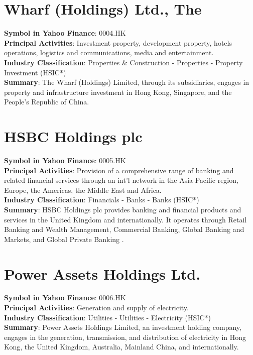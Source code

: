 \section{Wharf (Holdings) Ltd., The}
\textbf{Symbol in Yahoo Finance}: 0004.HK\\
\textbf{Principal Activities}: Investment property, development property, hotels operations, logistics and communications, media and entertainment.\\
\textbf{Industry Classification}: Properties \& Construction - Properties - Property Investment (HSIC*)\\
\textbf{Summary}: The Wharf (Holdings) Limited, through its subsidiaries, engages in property and infrastructure investment in Hong Kong, Singapore, and the People's Republic of China.


\section{HSBC Holdings plc}
\textbf{Symbol in Yahoo Finance}: 0005.HK\\
\textbf{Principal Activities}: Provision of a comprehensive range of banking and related financial services through an int'l network in the Asia-Pacific region, Europe, the Americas, the Middle East and Africa.\\
\textbf{Industry Classification}: Financials - Banks - Banks (HSIC*)\\
\textbf{Summary}: HSBC Holdings plc provides banking and financial products and services in the United Kingdom and internationally. It operates through Retail Banking and Wealth Management, Commercial Banking, Global Banking and Markets, and Global Private Banking .


\section{Power Assets Holdings Ltd.}
\textbf{Symbol in Yahoo Finance}: 0006.HK\\
\textbf{Principal Activities}: Generation and supply of electricity.\\
\textbf{Industry Classification}: Utilities - Utilities - Electricity (HSIC*)\\
\textbf{Summary}: Power Assets Holdings Limited, an investment holding company, engages in the generation, transmission, and distribution of electricity in Hong Kong, the United Kingdom, Australia, Mainland China, and internationally.


